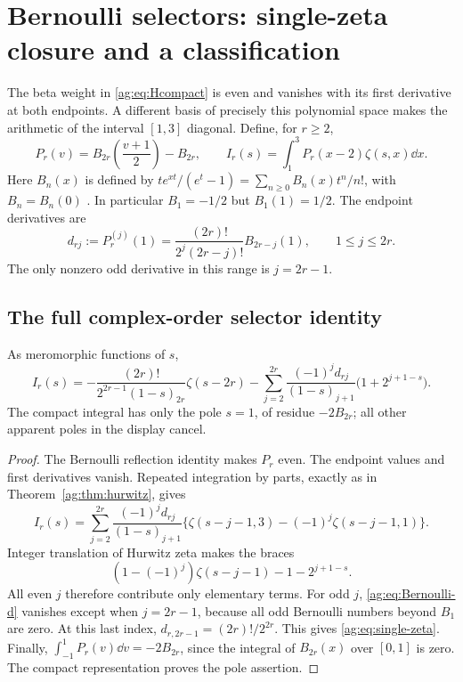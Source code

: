 \section{Bernoulli selectors: single-zeta closure and a classification}
\label{ag:sec:bernoulli}

The beta weight in \eqref{ag:eq:Hcompact} is even and vanishes with its
first derivative at both endpoints. A different basis of precisely this
polynomial space makes the arithmetic of the interval $[1,3]$ diagonal.
Define, for $r\ge2$,
\begin{equation}\label{ag:eq:Bernoulli-weight}
 P_r(v)=B_{2r}\left(\frac{v+1}{2}\right)-B_{2r},\qquad
 I_r(s)=\int_1^3P_r(x-2)\zeta(s,x)\dd x.
\end{equation}
Here $B_n(x)$ is defined by
$te^{xt}/(e^t-1)=\sum_{n\ge0}B_n(x)t^n/n!$, with $B_n=B_n(0)$
\cite{DLMFBernoulli}. In particular $B_1=-1/2$ but $B_1(1)=1/2$.
The endpoint derivatives are
\begin{equation}\label{ag:eq:Bernoulli-d}
 d_{rj}:=P_r^{(j)}(1)
 =\frac{(2r)!}{2^j(2r-j)!}B_{2r-j}(1),\qquad 1\le j\le2r.
\end{equation}
The only nonzero odd derivative in this range is $j=2r-1$.

\subsection{The full complex-order selector identity}
\begin{theorem}
\label{ag:thm:single-zeta}
As meromorphic functions of $s$,
\begin{equation}\label{ag:eq:single-zeta}
 \boxed{
 I_r(s)=-\frac{(2r)!}{2^{2r-1}(1-s)_{2r}}\zeta(s-2r)
 -\sum_{j=2}^{2r}\frac{(-1)^jd_{rj}}{(1-s)_{j+1}}
                                    \bigl(1+2^{j+1-s}\bigr).}
\end{equation}
The compact integral has only the pole $s=1$, of residue $-2B_{2r}$;
all other apparent poles in the display cancel.
\end{theorem}
\begin{proof}
The Bernoulli reflection identity makes $P_r$ even. The endpoint values
and first derivatives vanish. Repeated integration by parts, exactly as
in Theorem~\ref{ag:thm:hurwitz}, gives
\[
 I_r(s)=\sum_{j=2}^{2r}\frac{(-1)^jd_{rj}}{(1-s)_{j+1}}
       \bigl\{\zeta(s-j-1,3)-(-1)^j\zeta(s-j-1,1)\bigr\}.
\]
Integer translation of Hurwitz zeta makes the braces
\[
 (1-(-1)^j)\zeta(s-j-1)-1-2^{j+1-s}.
\]
All even $j$ therefore contribute only elementary terms. For odd $j$,
\eqref{ag:eq:Bernoulli-d} vanishes except when $j=2r-1$, because all
odd Bernoulli numbers beyond $B_1$ are zero. At this last index,
$d_{r,2r-1}=(2r)!/2^{2r}$. This gives
\eqref{ag:eq:single-zeta}. Finally,
$\int_{-1}^1P_r(v)\dd v=-2B_{2r}$, since the integral of
$B_{2r}(x)$ over $[0,1]$ is zero. The compact representation proves the
pole assertion.
\end{proof}

